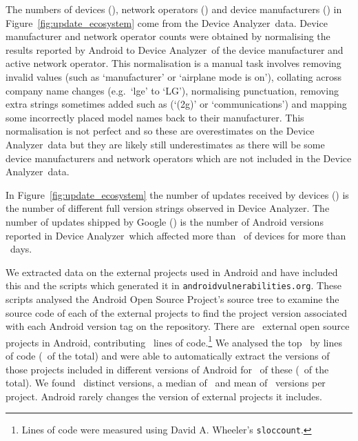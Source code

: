 \documentclass[conference,a4paper,twoside]{IEEEtran}
\let\OldTodo\todo
\renewcommand{\todo}{\OldTodo[inline]}
\newcommand{\todolater}[1]{}%
\newcommand{\da}{Device Analyzer}
\newcommand{\avo}{\texttt{androidvulnerabilities.org}}
\begin{document}
The numbers of devices (\daNumOSDevices), network operators (\daNumOperators) and device manufacturers (\daNumManufacturers) in Figure~\ref{fig:update_ecosystem} come from the \da\ data.
Device manufacturer and network operator counts were obtained by normalising the results reported by Android to \da\ of the device manufacturer and active network operator.
This normalisation is a manual task involves removing invalid values (such as `manufacturer' or `airplane mode is on'), collating across company name changes (e.g.\ `lge' to `LG'), normalising punctuation, removing extra strings sometimes added such as (`(2g)' or `communications') and mapping some incorrectly placed model names back to their manufacturer.
This normalisation is not perfect and so these are overestimates on the \da\ data but they are likely still underestimates as there will be some device manufacturers and network operators which are not included in the \da\ data.

In Figure~\ref{fig:update_ecosystem} the number of updates received by devices (\daNumFullVersions) is the number of different full version strings observed in \da.
The number of updates shipped by Google (\daNumSigOSVersions) is the number of Android versions reported in \da\ which affected more than \daSigVersionPerc\ of devices for more than \daSigVersionDays\ days. \todolater{this is the wrong number to be using}

We extracted data on the external projects used in Android and have included this and the scripts which generated it in \avo.
These scripts analysed the Android Open Source Project's source tree to examine the source code of each of the external projects to find the project version associated with each Android version tag on the repository.
There are \avoNumExternalProjects\ external open source projects in Android, contributing \avoTotalExternalLines\ lines of code.\footnote{Lines of code were measured using David A. Wheeler's \texttt{sloccount}.}
We analysed the top \avoNumBigExternalProjects\ by lines of code (\avoBigExternalLinesOfCodePerc\ of the total) and were able to automatically extract the versions of those projects included in different versions of Android for \avoNumAnalysedExternalProjects\ of these (\avoAnalysedExternalLinesOfCodePerc\ of the total).
We found \avoBigExternalTotalVersions\ distinct versions, a median of \avoBigExternalMedianVersions\ and mean of \avoBigExternalMeanVersions\ versions per project.
Android rarely changes the version of external projects it includes.
\end{document}
